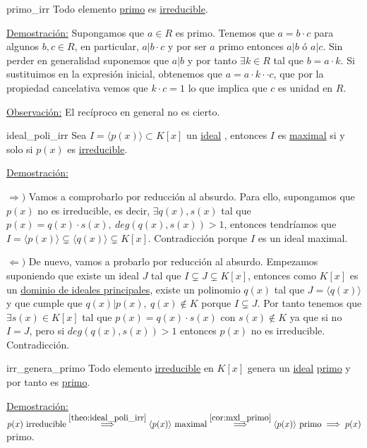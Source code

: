 \documentclass[10pt, a4paper]{article}
\newcommand{\obs}{\underline{Observación:} }
\newcommand{\demo}{\underline{Demostración:} }
\newcommand{\ideal}[1][]{\hyperref[def:ideal]{ideal}#1 }
\begin{document}
\begin{proposition}{}{primo_irr}
Todo elemento \hyperref[def:ele_primo]{primo} es \hyperref[def:ele_irr]{irreducible}.
\end{proposition}

\demo Supongamos que $a \in R$ es primo. Tenemos que $a = b \cdot c$ para algunos $b,c \in R$, en particular, $a | b \cdot c$ y por ser $a$ primo entonces $a | b$ ó $a | c$. Sin perder en generalidad suponemos que $a | b$ y por tanto $\exists k \in R$ tal que $b = a \cdot k$. Si sustituimos en la expresión inicial, obtenemos que $a = a \cdot k \cdot \cdot c$, que por la propiedad cancelativa vemos que $k \cdot c = 1$ lo que implica que $c$ es unidad en $R$.

\vspace{3mm}

\obs El recíproco en general no es cierto.

\begin{theorem}{}{ideal_poli_irr}
Sea $I = \langle p(x)\rangle \subset K[x]$ un \ideal, entonces $I$ es \hyperref[def:ideal_maximal]{maximal} si y solo si $p(x)$ es \hyperref[def:ele_irr]{irreducible}.
\end{theorem}

\demo 

$\Longrightarrow )$ Vamos a comprobarlo por reducción al absurdo. Para ello, supongamos que $p(x)$ no es irreducible, es decir, $\exists q(x), s(x)$ tal que $p(x) = q(x) \cdot s(x),\ deg(q(x), s(x)) > 1$, entonces tendríamos que $I = \langle p(x) \rangle \subsetneq \langle q(x) \rangle \subsetneq K[x]$. Contradicción porque $I$ es un ideal maximal.

$\Longleftarrow )$ De nuevo, vamos a probarlo por reducción al absurdo. Empezamos suponiendo que existe un ideal $J$ tal que $I \subsetneq J \subsetneq K[x]$, entonces como $K[x]$ es un \hyperref[def:DIP]{dominio de ideales principales}, existe un polinomio $q(x)$ tal que $J = \langle q(x) \rangle$ y que cumple que $q(x) | p(x),\ q(x) \notin K$ porque $I \subsetneq J$. Por tanto tenemos que $\exists s(x) \in K[x]$ tal que $p(x) = q(x) \cdot s(x)$ con $s(x) \notin K$ ya que si no $I = J$, pero si $deg(q(x), s(x)) > 1$ entonces $p(x)$ no es irreducible. Contradicción.

\begin{corolary}{}{irr_genera_primo}
Todo elemento \hyperref[def:ele_irr]{irreducible} en $K[x]$ genera un \ideal \hyperref[def:ideal_primo]{primo} y por tanto es \hyperref[def:ele_primo]{primo}.
\end{corolary}

\demo $p(x) \text{ irreducible} \overset{\ref{theo:ideal_poli_irr}}{\implies} \langle p(x) \rangle \text{ maximal} \overset{\ref{cor:mxl_primo}}{\implies} \langle p(x) \rangle \text{ primo} \implies  p(x)$ primo.
\end{document}
